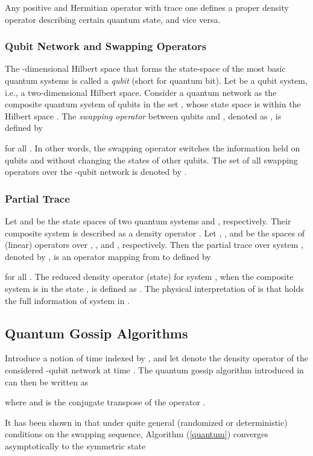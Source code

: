 \documentclass[a4paper, 11pt]{article}
\begin{document}
{Any  positive and Hermitian operator  with trace one defines a proper density operator describing certain quantum state, and vice versa.


\subsubsection{Qubit Network and Swapping Operators}
The -dimensional Hilbert space that forms the state-space of the most basic quantum systems is called a {\it qubit} (short for quantum bit). Let  be a qubit system, i.e., a two-dimensional Hilbert space. Consider a quantum network as the composite quantum system of  qubits in the set , whose state space is within the Hilbert space .  The {\it swapping operator} between qubits  and , denoted as ,  is defined by

for all . In other words, the swapping operator  switches the information held on qubits  and  without changing the states of other qubits. The set of all swapping operators over the -{qubit} network is denoted {by} .


\subsubsection{Partial Trace}
Let  and  be the state spaces of  two quantum systems  and , respectively. Their composite system is described as a density operator . Let , , and   be the spaces of (linear) operators over  , , and  , respectively.   Then the partial trace over system , denoted by , is an operator mapping from  to  defined by

for  all .
The reduced density operator (state) for system , when the composite system is in the state  , is defined as . The physical interpretation of  is that  holds the full information of system  in .


}


\subsection{Quantum Gossip Algorithms}

{Introduce a notion of time indexed by , and let  denote the density operator  of the considered -qubit network at time . The quantum gossip algorithm introduced in~\cite{Mazzarella2013a,Mazzarella2013b} can then be written as}

{where  and  is the conjugate transpose of the operator .}

It has been shown in \cite{Mazzarella2013a,Mazzarella2013b} that under quite general (randomized or deterministic) conditions {on} the {swapping sequence}, Algorithm (\ref{quantum}) {converges} asymptotically to the  symmetric state
\end{document}

